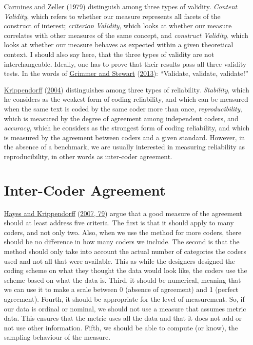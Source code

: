 \documentclass[
]{book}
\begin{document}
\protect\hyperlink{ref-Carmines1979a}{Carmines and Zeller} (\protect\hyperlink{ref-Carmines1979a}{1979}) distinguish among three types of validity. \emph{Content Validity}, which refers to whether our measure represents all facets of the construct of interest; \emph{criterion Validity}, which looks at whether our measure correlates with other measures of the same concept, and \emph{construct Validity}, which looks at whether our measure behaves as expected within a given theoretical context.
I should also say here, that the three types of validity are not interchangeable. Ideally, one has to prove that their results pass all three validity tests. In the words of \protect\hyperlink{ref-Grimmer2013a}{Grimmer and Stewart} (\protect\hyperlink{ref-Grimmer2013a}{2013}): ``Validate, validate, validate!''

\protect\hyperlink{ref-Krippendorff2004a}{Krippendorff} (\protect\hyperlink{ref-Krippendorff2004a}{2004}) distinguishes among three types of reliability. \emph{Stability}, which he considers as the weakest form of coding reliability, and which can be measured when the same text is coded by the same coder more than once, \emph{reproducibility}, which is measured by the degree of agreement among independent coders, and \emph{accuracy}, which he considers as the strongest form of coding reliability, and which is measured by the agreement between coders and a given standard. However, in the absence of a benchmark, we are usually interested in measuring reliability as reproducibility, in other words as inter-coder agreement.

\hypertarget{inter-coder-agreement}{%
\section{Inter-Coder Agreement}\label{inter-coder-agreement}}

\protect\hyperlink{ref-Hayes2007a}{Hayes and Krippendorff} (\protect\hyperlink{ref-Hayes2007a}{2007, 79}) argue that a good measure of the agreement should at least address five criteria. The first is that it should apply to many coders, and not only two. Also, when we use the method for more coders, there should be no difference in how many coders we include. The second is that the method should only take into account the actual number of categories the coders used and not all that were available. This as while the designers designed the coding scheme on what they thought the data would look like, the coders use the scheme based on what the data is. Third, it should be numerical, meaning that we can use it to make a scale between 0 (absence of agreement) and 1 (perfect agreement). Fourth, it should be appropriate for the level of measurement. So, if our data is ordinal or nominal, we should not use a measure that assumes metric data. This ensures that the metric uses all the data and that it does not add or not use other information. Fifth, we should be able to compute (or know), the sampling behaviour of the measure.
\end{document}

